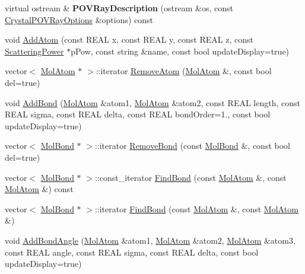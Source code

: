 \begin{DoxyCompactItemize}
\mbox{\label{class_obj_cryst_1_1_molecule_a29d8b1a13f7150e0f7531b2f8cfdc6a0}} 
virtual ostream \& {\bfseries P\+O\+V\+Ray\+Description} (ostream \&os, const \mbox{\hyperlink{struct_obj_cryst_1_1_crystal_p_o_v_ray_options}{Crystal\+P\+O\+V\+Ray\+Options}} \&options) const
\item 
void \mbox{\hyperlink{class_obj_cryst_1_1_molecule_a7b193eac062233b758887cba671706f7}{Add\+Atom}} (const R\+E\+AL x, const R\+E\+AL y, const R\+E\+AL z, const \mbox{\hyperlink{class_obj_cryst_1_1_scattering_power}{Scattering\+Power}} $\ast$p\+Pow, const string \&name, const bool update\+Display=true)
\item 
vector$<$ \mbox{\hyperlink{class_obj_cryst_1_1_mol_atom}{Mol\+Atom}} $\ast$ $>$\+::iterator \mbox{\hyperlink{class_obj_cryst_1_1_molecule_a66bbf57cc85b1f5930b922edc3286fae}{Remove\+Atom}} (\mbox{\hyperlink{class_obj_cryst_1_1_mol_atom}{Mol\+Atom}} \&, const bool del=true)
\item 
void \mbox{\hyperlink{class_obj_cryst_1_1_molecule_aa37feb3abde7ca0ff6453b97d910800f}{Add\+Bond}} (\mbox{\hyperlink{class_obj_cryst_1_1_mol_atom}{Mol\+Atom}} \&atom1, \mbox{\hyperlink{class_obj_cryst_1_1_mol_atom}{Mol\+Atom}} \&atom2, const R\+E\+AL length, const R\+E\+AL sigma, const R\+E\+AL delta, const R\+E\+AL bond\+Order=1., const bool update\+Display=true)
\item 
vector$<$ \mbox{\hyperlink{class_obj_cryst_1_1_mol_bond}{Mol\+Bond}} $\ast$ $>$\+::iterator \mbox{\hyperlink{class_obj_cryst_1_1_molecule_aa02f2f7cea34333b5ddbb4a16678b7a4}{Remove\+Bond}} (const \mbox{\hyperlink{class_obj_cryst_1_1_mol_bond}{Mol\+Bond}} \&, const bool del=true)
\item 
vector$<$ \mbox{\hyperlink{class_obj_cryst_1_1_mol_bond}{Mol\+Bond}} $\ast$ $>$\+::const\+\_\+iterator \mbox{\hyperlink{class_obj_cryst_1_1_molecule_a78cdfa9c0223f1f45d5aac3b0e0d4989}{Find\+Bond}} (const \mbox{\hyperlink{class_obj_cryst_1_1_mol_atom}{Mol\+Atom}} \&, const \mbox{\hyperlink{class_obj_cryst_1_1_mol_atom}{Mol\+Atom}} \&) const
\item 
vector$<$ \mbox{\hyperlink{class_obj_cryst_1_1_mol_bond}{Mol\+Bond}} $\ast$ $>$\+::iterator \mbox{\hyperlink{class_obj_cryst_1_1_molecule_a44ab98d43be98b63297c0059a73e07ad}{Find\+Bond}} (const \mbox{\hyperlink{class_obj_cryst_1_1_mol_atom}{Mol\+Atom}} \&, const \mbox{\hyperlink{class_obj_cryst_1_1_mol_atom}{Mol\+Atom}} \&)
\item 
void \mbox{\hyperlink{class_obj_cryst_1_1_molecule_a25132c259da4d0bd739ff0ffc008575e}{Add\+Bond\+Angle}} (\mbox{\hyperlink{class_obj_cryst_1_1_mol_atom}{Mol\+Atom}} \&atom1, \mbox{\hyperlink{class_obj_cryst_1_1_mol_atom}{Mol\+Atom}} \&atom2, \mbox{\hyperlink{class_obj_cryst_1_1_mol_atom}{Mol\+Atom}} \&atom3, const R\+E\+AL angle, const R\+E\+AL sigma, const R\+E\+AL delta, const bool update\+Display=true)

\end{DoxyCompactItemize}
